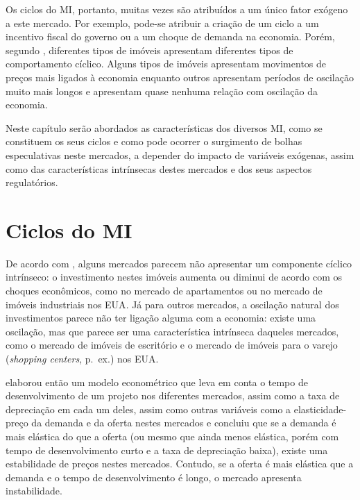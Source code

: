 \documentclass[
	12pt,				%
	oneside,			%
	a4paper,			%
	chapter=TITLE,		%
	section=TITLE,		%
	english,			%
	brazil				%
	]{abntex2}
\begin{document}
\begin{refsection}
Os ciclos do \gls{MI}, portanto, muitas vezes são atribuídos a um único fator
exógeno a este mercado. Por exemplo, pode-se atribuir a criação de um ciclo a um
incentivo fiscal do governo ou a um choque de demanda na economia. Porém,
segundo \textcite[p.~209-210]{wheaton1999}, diferentes tipos de imóveis apresentam
diferentes tipos de comportamento cíclico. Alguns tipos de imóveis apresentam
movimentos de preços mais ligados à economia enquanto outros apresentam períodos
de oscilação muito mais longos e apresentam quase nenhuma relação com oscilação
da economia.

Neste capítulo serão abordados as características dos diversos \gls{MI}, como
se constituem os seus ciclos e como pode ocorrer o surgimento de bolhas
especulativas neste mercados, a depender do impacto de variáveis exógenas, assim
como das características intrínsecas destes mercados e dos seus aspectos
regulatórios.

\hypertarget{ciclos-do}{%
\section{\texorpdfstring{Ciclos do \gls{MI}}{Ciclos do }}\label{ciclos-do}}

De acordo com \textcite[p.~212]{wheaton1999}, alguns mercados parecem não apresentar um
componente cíclico intrínseco: o investimento nestes imóveis aumenta ou diminui
de acordo com os choques econômicos, como no mercado de apartamentos ou no
mercado de imóveis industriais nos \gls{EUA}. Já para outros mercados, a
oscilação natural dos investimentos parece não ter ligação alguma com a
economia: existe uma oscilação, mas que parece ser uma característica intrínseca
daqueles mercados, como o mercado de imóveis de escritório e o mercado de
imóveis para o varejo (\emph{shopping centers}, p.~ex.) nos \gls{EUA}.

\textcite{wheaton1999} elaborou então um modelo econométrico que leva em conta o tempo de
desenvolvimento de um projeto nos diferentes mercados, assim como a taxa de
depreciação em cada um deles, assim como outras variáveis como a
elasticidade-preço da demanda e da oferta nestes mercados e concluiu que se a
demanda é mais elástica do que a oferta (ou mesmo que ainda menos elástica,
porém com tempo de desenvolvimento curto e a taxa de depreciação baixa),
existe uma estabilidade de preços nestes mercados. Contudo, se a oferta é mais
elástica que a demanda e o tempo de desenvolvimento é longo, o mercado
apresenta instabilidade.


\end{refsection}
\end{document}
